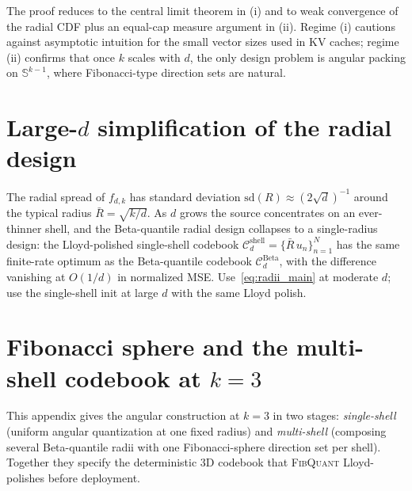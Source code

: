 \documentclass{article}
\theoremstyle{definition}
\theoremstyle{remark}
\newcommand{\bbS}{\mathbb{S}}
\begin{document}
The proof reduces to the central limit theorem in (i) and to weak
convergence of the radial CDF plus an equal-cap measure argument in
(ii).  Regime (i) cautions against asymptotic intuition for the
small vector sizes used in KV caches; regime (ii) confirms that
once $k$ scales with $d$, the only design problem is angular
packing on $\bbS^{k - 1}$, where Fibonacci-type direction sets are
natural.

\section{Large-\texorpdfstring{$d$}{d} simplification of the radial design}
\label{app:asymptotic}

The radial spread of $f_{d, k}$ has standard deviation
$\mathrm{sd}(R) \approx (2\sqrt d)^{-1}$ around the typical radius
$\bar R = \sqrt{k/d}$.  As $d$ grows the source concentrates on an
ever-thinner shell, and the Beta-quantile radial design collapses
to a single-radius design: the Lloyd-polished single-shell codebook
$\mathcal{C}_d^{\mathrm{shell}} = \{\bar R\, u_n\}_{n = 1}^{N}$ has
the same finite-rate optimum as the Beta-quantile codebook
$\mathcal{C}_d^{\mathrm{Beta}}$, with the difference vanishing at
$O(1/d)$ in normalized MSE.  Use~\eqref{eq:radii_main} at moderate
$d$; use the single-shell init at large $d$ with the same Lloyd
polish.

\section{Fibonacci sphere and the multi-shell codebook at \texorpdfstring{$k = 3$}{k=3}}
\label{app:k3_construction}

This appendix gives the angular construction at $k = 3$ in two
stages: \emph{single-shell} (uniform angular quantization at one
fixed radius) and \emph{multi-shell} (composing several Beta-quantile
radii with one Fibonacci-sphere direction set per shell).  Together
they specify the deterministic 3D codebook that \textsc{FibQuant}
Lloyd-polishes before deployment.
\end{document}
